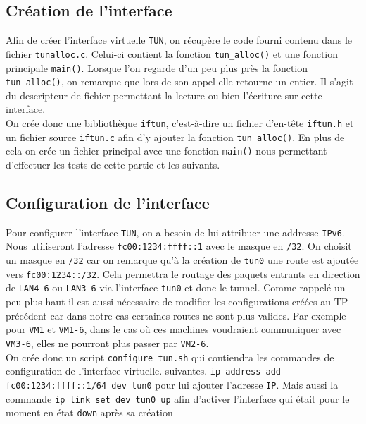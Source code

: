 \documentclass[a4paper, 12pt]{article}
\begin{document}
    \subsection{Création de l'interface}
    Afin de créer l'interface virtuelle \verb+TUN+, on récupère le code fourni 
    contenu dans le fichier \verb+tunalloc.c+. Celui-ci contient la fonction 
    \verb+tun_alloc()+ et une fonction principale \verb+main()+. Lorsque l'on 
    regarde d'un peu plus près la fonction \verb+tun_alloc()+, on remarque que 
    lors de son appel elle retourne un entier. Il s'agit du descripteur de 
    fichier permettant la lecture ou bien l'écriture sur cette interface. \\

    On crée donc une bibliothèque \verb+iftun+, c'est-à-dire un fichier 
    d'en-tête \verb+iftun.h+ et un fichier source \verb+iftun.c+ afin d'y 
    ajouter la fonction \verb+tun_alloc()+. En plus de cela on crée un fichier 
    principal avec une fonction \verb+main()+ nous permettant d'effectuer les 
    tests de cette partie et les suivants.

    \subsection{Configuration de l'interface}
    Pour configurer l'interface \verb+TUN+, on a besoin de lui attribuer une 
    addresse \verb+IPv6+. Nous utiliseront l'adresse \verb+fc00:1234:ffff::1+ 
    avec le masque en \verb+/32+. On choisit un masque en \verb+/32+ car on 
    remarque qu'à la création de \verb+tun0+ une route est ajoutée vers 
    \verb+fc00:1234::/32+. Cela permettra le routage des paquets entrants en 
    direction de \verb+LAN4-6+ ou \verb+LAN3-6+ via l'interface \verb+tun0+ et
    donc le tunnel. Comme rappelé un peu plus haut il est aussi nécessaire de 
    modifier les configurations créées au TP précédent car dans notre cas 
    certaines routes ne sont plus valides. Par exemple pour \verb+VM1+ et 
    \verb+VM1-6+, dans le cas où ces machines voudraient communiquer avec 
    \verb+VM3-6+, elles ne pourront plus passer par \verb+VM2-6+. \\

    On crée donc un script \verb+configure_tun.sh+ qui contiendra les commandes
    de configuration de l'interface virtuelle. suivantes.
    \verb+ip address add fc00:1234:ffff::1/64 dev tun0+ pour lui ajouter 
    l'adresse \verb+IP+. Mais aussi la commande \verb+ip link set dev tun0 up+
    afin d'activer l'interface qui était pour le moment en état \verb+down+ 
    après sa création \\
\end{document}
